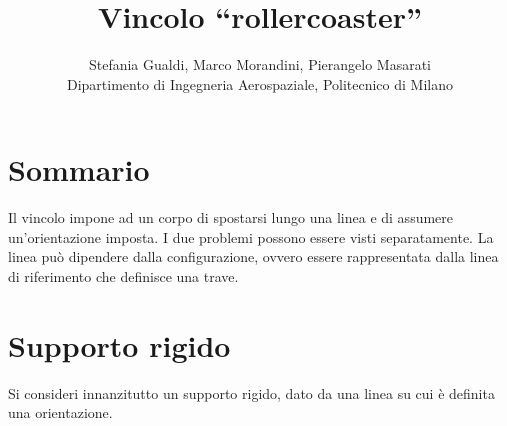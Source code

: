 \documentclass[12pt,dvips,fleqn,italian]{article}
\begin{document}
\title{\textbf{Vincolo ``rollercoaster''}}
\author{Stefania Gualdi, Marco Morandini, Pierangelo Masarati \\
\small Dipartimento di Ingegneria Aerospaziale, Politecnico di Milano}
\date{}
\maketitle

\section*{Sommario}
Il vincolo impone ad un corpo di spostarsi lungo una linea e di assumere
un'orientazione imposta.
I due problemi possono essere visti separatamente.
La linea pu\`o dipendere dalla configurazione, ovvero essere rappresentata
dalla linea di riferimento che definisce una trave.


\section*{Supporto rigido}
Si consideri innanzitutto un supporto rigido, dato da una linea su cui
\`e definita una orientazione.
\end{document}
